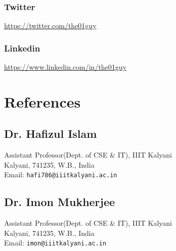 \documentclass{article}
\begin{document}
\subsubsection{Twitter}
\url{https://twitter.com/the01guy}
\subsubsection{Linkedin}
\url{https://www.linkedin.com/in/the01guy}

\section{References}
\subsection{Dr. Hafizul Islam}
Assistant Professor(Dept. of CSE \& IT), IIIT Kalyani\\
Kalyani, 741235, W.B., India\\
Email: \texttt{hafi786@iiitkalyani.ac.in}
\subsection{Dr. Imon Mukherjee}
Assistant Professor(Dept. of CSE \& IT), IIIT Kalyani\\
Kalyani, 741235, W.B., India\\
Email: \texttt{imon@iiitkalyani.ac.in}
\end{document}
